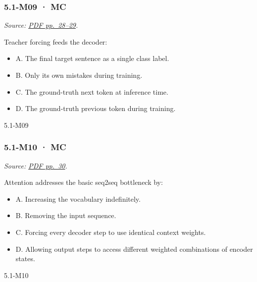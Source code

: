 \noindent\begin{minipage}{\linewidth}

\subsubsection{5.1-M09 · MC}\label{m09-mc-12}

\emph{Source:
\href{../Lecture\%20Slides/5.1.\%20Sequence\%20Models.pdf\#page=28}{PDF
pp.~28--29}.}

Teacher forcing feeds the decoder:

\begin{itemize}
\tightlist
\item
  A. The final target sentence as a single class label.
\item
  B. Only its own mistakes during training.
\item
  C. The ground-truth next token at inference time.
\item
  D. The ground-truth previous token during training.
\end{itemize}

\begin{solution}[8mm]{5.1-M09}

\end{solution}
\end{minipage}\par\medskip

\noindent\begin{minipage}{\linewidth}

\subsubsection{5.1-M10 · MC}\label{m10-mc-12}

\emph{Source:
\href{../Lecture\%20Slides/5.1.\%20Sequence\%20Models.pdf\#page=30}{PDF
pp.~30}.}

Attention addresses the basic seq2seq bottleneck by:

\begin{itemize}
\tightlist
\item
  A. Increasing the vocabulary indefinitely.
\item
  B. Removing the input sequence.
\item
  C. Forcing every decoder step to use identical context weights.
\item
  D. Allowing output steps to access different weighted combinations of
  encoder states.
\end{itemize}

\begin{solution}[8mm]{5.1-M10}

\end{solution}
\end{minipage}\par\medskip

